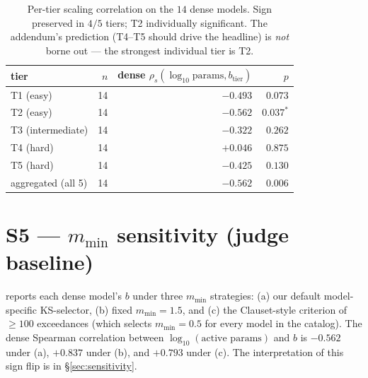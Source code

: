 \documentclass{article}
\newcommand{\sdi}{\ensuremath{b}}
\begin{document}
\begin{table}[h]
\centering
\small
\begin{tabular}{l r r r}
\toprule
tier & $n$ & dense $\rho_s(\log_{10}\text{params}, \sdi_{\text{tier}})$ & $p$ \\
\midrule
T1 (easy)         & 14 & $-0.493$ & $0.073$ \\
T2 (easy)         & 14 & $-0.562$ & $0.037^{*}$ \\
T3 (intermediate) & 14 & $-0.322$ & $0.262$ \\
T4 (hard)         & 14 & $+0.046$ & $0.875$ \\
T5 (hard)         & 14 & $-0.425$ & $0.130$ \\
\midrule
aggregated (all 5) & 14 & $\mathbf{-0.562}$ & $\mathbf{0.006}$ \\
\bottomrule
\end{tabular}
\caption{Per-tier scaling correlation on the $14$ dense models.
Sign preserved in $4/5$ tiers; T2 individually significant. The
addendum's prediction (T4--T5 should drive the headline) is
\emph{not} borne out --- the strongest individual tier is T2.}
\label{tab:per_tier}
\end{table}

\section{\texorpdfstring{S5 --- $m_{\min}$ sensitivity (judge baseline)}{S5 --- m-min sensitivity (judge baseline)}}\label{app:s5}

 reports each dense model's \sdi{} under three
$m_{\min}$ strategies: (a) our default model-specific KS-selector,
(b) fixed $m_{\min} = 1.5$, and (c) the Clauset-style criterion of
$\geq 100$ exceedances (which selects $m_{\min} = 0.5$ for every
model in the catalog). The dense Spearman correlation between
$\log_{10}(\text{active params})$ and \sdi{} is $-0.562$ under (a),
$+0.837$ under (b), and $+0.793$ under (c). The interpretation of
this sign flip is in \S\ref{sec:sensitivity}.
\end{document}
